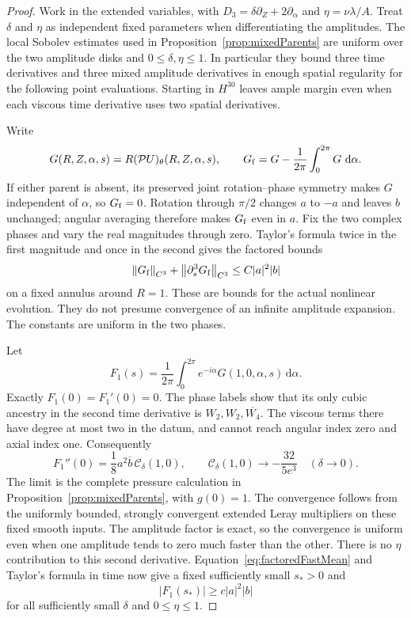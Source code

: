 \documentclass[11pt]{article}
\theoremstyle{remark}
\newcommand{\PP}{\mathcal P}
\newcommand{\dd}{\,\mathrm d}
\newcommand{\norm}[1]{\left\lVert#1\right\rVert}
\begin{document}
\begin{proof}
Work in the extended variables, with
$D_3=\delta\partial_Z+2\partial_\alpha$ and
$\eta=\nu\lambda/A$. Treat $\delta$ and $\eta$ as independent fixed
parameters when differentiating the amplitudes. The local Sobolev
estimates used in Proposition~\ref{prop:mixedParents} are uniform
over the two amplitude disks and $0\leq\delta,\eta\leq1$.
In particular they bound three time derivatives and three mixed
amplitude derivatives in enough spatial regularity for the following
point evaluations. Starting in $H^{30}$ leaves ample margin even when
each viscous time derivative uses two spatial derivatives.

Write
\[
 G(R,Z,\alpha,s)=R(\PP U)_\theta(R,Z,\alpha,s),\qquad
 G_{\rm f}=G-\frac1{2\pi}\int_0^{2\pi}G\,\dd\alpha .
\]
If either parent is absent, its preserved joint rotation--phase
symmetry makes $G$ independent of $\alpha$, so $G_{\rm f}=0$.
Rotation through $\pi/2$ changes $a$ to $-a$ and leaves $b$ unchanged;
angular averaging therefore makes $G_{\rm f}$ even in $a$.
Fix the two complex phases and vary the real magnitudes through zero.
Taylor's formula twice in the first magnitude and once in the second
gives the factored bounds
\begin{equation}\label{eq:factoredFastMean}
 \norm{G_{\rm f}}_{C^3}+
       \norm{\partial_s^3G_{\rm f}}_{C^3}
                           \leq C|a|^2|b|
\end{equation}
on a fixed annulus around $R=1$. These are bounds for the actual
nonlinear evolution. They do not presume convergence of an infinite
amplitude expansion. The constants are uniform in the two phases.

Let
\[
 F_1(s)=\frac1{2\pi}\int_0^{2\pi}
              e^{-i\alpha}G(1,0,\alpha,s)\dd\alpha .
\]
Exactly $F_1(0)=F_1'(0)=0$. The phase labels show that its only
cubic ancestry in the second time derivative is $W_2,W_2,\overline{W_4}$.
The viscous terms there have degree at most two in the datum, and
cannot reach angular index zero and axial index one. Consequently
\[
 F_1''(0)=\frac18a^2\overline b\,\mathcal C_\delta(1,0),
 \qquad
 \mathcal C_\delta(1,0)\longrightarrow-\frac{32}{5e^3}
                            \quad(\delta\to0).
\]
The limit is the complete pressure calculation in
Proposition~\ref{prop:mixedParents}, with $g(0)=1$.
The convergence follows from the uniformly bounded, strongly
convergent extended Leray multipliers on these fixed smooth inputs.
The amplitude factor is exact, so the convergence is uniform even
when one amplitude tends to zero much faster than the other.
There is no $\eta$ contribution to this second derivative.
Equation~\eqref{eq:factoredFastMean} and Taylor's formula in time
now give a fixed sufficiently small $s_*>0$ and
\begin{equation}\label{eq:fastMeanLower}
 |F_1(s_*)|\geq c|a|^2|b|
\end{equation}
for all sufficiently small $\delta$ and $0\leq\eta\leq1$.


\end{proof}
\end{document}
